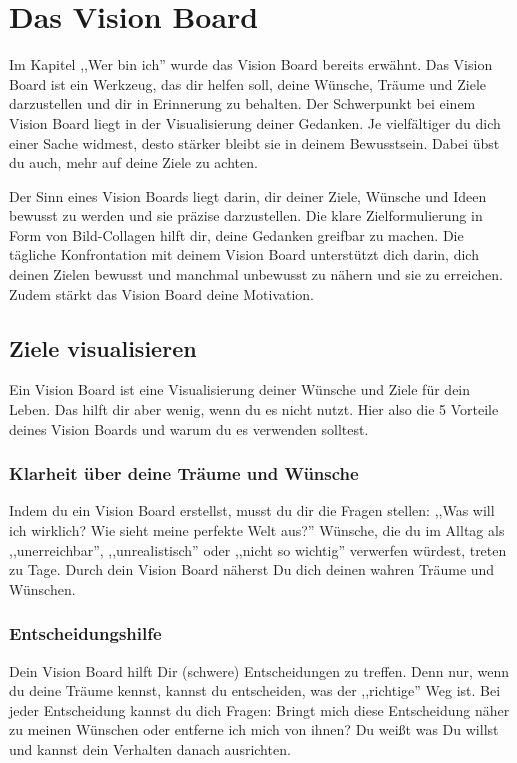 \documentclass[../Lebensziel.tex]{subfiles}
\begin{document}
\chapter{Das Vision Board}\thispagestyle{fancy}

Im Kapitel ,,Wer bin ich'' wurde das Vision Board bereits erwähnt. Das Vision Board ist ein Werkzeug, das dir helfen soll, deine Wünsche, Träume und Ziele darzustellen und dir in Erinnerung zu behalten.
Der Schwerpunkt bei einem Vision Board liegt in der Visualisierung deiner Gedanken. Je vielfältiger du dich einer Sache widmest, desto stärker bleibt sie in deinem Bewusstsein. Dabei übst du auch, mehr auf deine Ziele zu achten.

Der Sinn eines Vision Boards liegt darin, dir deiner Ziele, Wünsche und Ideen bewusst zu werden und sie präzise darzustellen. Die klare Zielformulierung in Form von Bild-Collagen hilft dir, deine Gedanken greifbar zu machen. Die tägliche Konfrontation mit deinem Vision Board unterstützt dich darin, dich deinen Zielen bewusst und manchmal unbewusst zu nähern und sie zu erreichen. Zudem stärkt das Vision Board deine Motivation.

\section{Ziele visualisieren}
Ein Vision Board ist eine Visualisierung deiner Wünsche und Ziele für dein Leben.
Das hilft dir aber wenig, wenn du es nicht nutzt.
Hier also die 5 Vorteile deines Vision Boards und warum du es verwenden solltest.

\subsection{Klarheit über deine Träume und Wünsche}
Indem du ein Vision Board erstellst, musst du dir die Fragen stellen: ,,Was will ich wirklich? Wie sieht meine perfekte Welt aus?''
Wünsche, die du im Alltag als ,,unerreichbar'', ,,unrealistisch'' oder ,,nicht so wichtig'' verwerfen würdest, treten zu Tage.
Durch dein Vision Board näherst Du dich deinen wahren Träume und Wünschen.

\subsection{Entscheidungshilfe}
Dein Vision Board hilft Dir (schwere) Entscheidungen zu treffen.
Denn nur, wenn du deine Träume kennst, kannst du entscheiden, was der ,,richtige'' Weg ist.
Bei jeder Entscheidung kannst du dich Fragen: Bringt mich diese Entscheidung näher zu meinen Wünschen oder entferne ich mich von ihnen?
Du weißt was Du willst und kannst dein Verhalten danach ausrichten.
\end{document}
